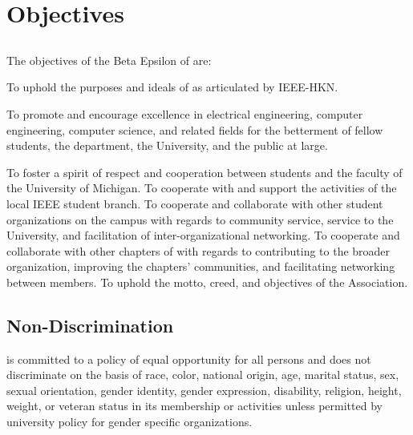 \chapter{Objectives}\label{sec:objectives}
\section{}
The objectives of the Beta Epsilon of \hkn are:


\begin{enumsubsection}

\itemnotoc To uphold the purposes and ideals of \hkn as articulated by IEEE-HKN.

\itemnotoc To promote and encourage excellence in electrical engineering, computer engineering, computer science, and related fields for the betterment of fellow students, the department, the University, and the public at large.

\itemnotoc To foster a spirit of respect and cooperation between students and the faculty of the University of Michigan.
\itemnotoc To cooperate with and support the activities of the local IEEE student branch.
\itemnotoc To cooperate and collaborate with other student organizations on the campus with regards to community service, service to the University, and facilitation of inter-organizational networking.
\itemnotoc To cooperate and collaborate with other chapters of \hkn with regards to contributing to the broader organization, improving the chapters' communities, and facilitating networking between \hkn members.
\itemnotoc To uphold the motto, creed, and objectives of the Association.

\end{enumsubsection}

\section{Non-Discrimination}
\hkn is committed to a policy of equal opportunity for all persons and does not discriminate on the basis of race, color, national origin, age, marital status, sex, sexual orientation, gender identity, gender expression, disability, religion, height, weight, or veteran status in its membership or activities unless permitted by university policy for gender specific organizations.

